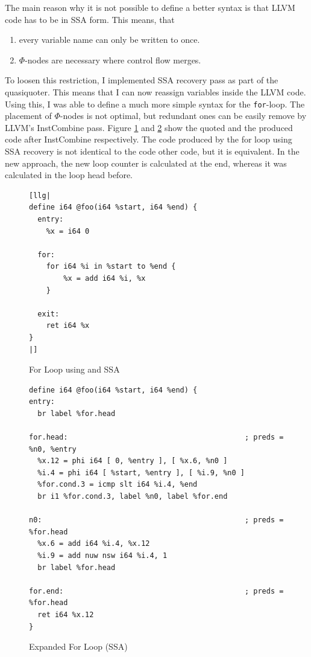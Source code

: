 \documentclass[a4paper,bibliography=totocnumbered,parskip,headsepline]{scrbook}
\begin{document}
The main reason why it is not possible to define a better syntax is that LLVM code has to be in SSA form.
This means, that
\begin{enumerate}
 \item every variable name can only be written to once.
 \item $\Phi$-nodes are necessary where control flow merges.
\end{enumerate}

To loosen this restriction, I implemented SSA recovery pass as part of the quasiquoter.
This means that I can now reassign variables inside the LLVM code.
Using this, I was able to define a much more simple syntax for the \lstinline{for}-loop.
The placement of $\Phi$-nodes is not optimal, but redundant ones can be easily remove by LLVM's InstCombine pass.
Figure \ref{fig:forquoteSSA} and \ref{fig:forquoteSSA1} show the quoted and the produced code after InstCombine respectively.
The code produced by the for loop using SSA recovery is not identical to the code other code, but it is equivalent.
In the new approach, the new loop counter is calculated at the end, whereas it was calculated in the loop head before.

\begin{figure}
\begin{lstlisting}
[llg|
define i64 @foo(i64 %start, i64 %end) {
  entry:
    %x = i64 0

  for:
    for i64 %i in %start to %end {
        %x = add i64 %i, %x
    }

  exit:
    ret i64 %x
}
|]
\end{lstlisting}
\caption{For Loop using  and SSA}
\label{fig:forquoteSSA}
\end{figure}

\begin{figure}
\begin{lstlisting}
define i64 @foo(i64 %start, i64 %end) {
entry:
  br label %for.head

for.head:                                         ; preds = %n0, %entry
  %x.12 = phi i64 [ 0, %entry ], [ %x.6, %n0 ]
  %i.4 = phi i64 [ %start, %entry ], [ %i.9, %n0 ]
  %for.cond.3 = icmp slt i64 %i.4, %end
  br i1 %for.cond.3, label %n0, label %for.end

n0:                                               ; preds = %for.head
  %x.6 = add i64 %i.4, %x.12
  %i.9 = add nuw nsw i64 %i.4, 1
  br label %for.head

for.end:                                          ; preds = %for.head
  ret i64 %x.12
}
\end{lstlisting}
\caption{Expanded For Loop (SSA)}
\label{fig:forquoteSSA1}
\end{figure}
\end{document}
